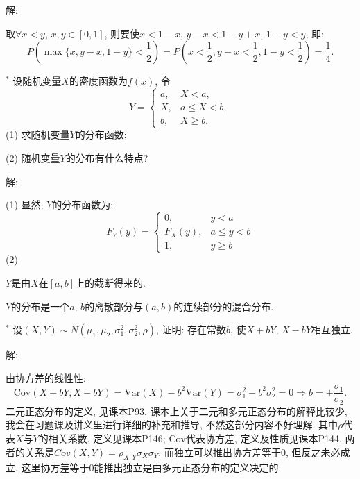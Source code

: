 \documentclass[standard]{ExBook}
\renewenvironment{shaded}{%
  \def\FrameCommand{\fboxsep=\FrameSep \colorbox{shadecolor}}%
  \MakeFramed{\advance\hsize-\width \FrameRestore}%
}{%
  \endMakeFramed
}
\begin{document}
\begin{qitems}
解: 

取$\forall x<y$, $x,y\in[0,1]$, 则要使$x<1-x$, $y-x<1-y+x$, $1-y<y$, 即:
$$P(\max\{x,y-x,1-y\}<\frac{1}{2})=P(x<\frac{1}{2},y-x<\frac{1}{2},1-y<\frac{1}{2})=\frac{1}{4}.$$

\vspace{2.5cm-5em}

    \begin{bbox}
    \begin{shaded}
        \qitem$^{*}$
设随机变量$X$的密度函数为$f(x)$, 令
$$
    Y=
    \left\{
    \begin{array}{ll}
        a, &X<a,\\
        X, &a\leq X<b,\\
        b, &X\geq b.
    \end{array}
    \right.
$$
(1) 求随机变量$Y$的分布函数;

(2) 随机变量$Y$的分布有什么特点?
    \end{shaded}
    \end{bbox}

\vspace{\dimexpr2.5cm-5em\relax}

解: 

(1) 显然, $Y$的分布函数为:
\[
F_Y(y) =
\begin{cases}
0, & y < a \\
F_X(y), & a \leq y < b \\
1, & y \geq b
\end{cases}
\]
(2) 

 $Y$是由$X$在$[a,b]$上的截断得来的.

 $Y$的分布是一个$a$, $b$的离散部分与$(a,b)$的连续部分的混合分布.

\vspace{2.5cm-5em}

    \begin{bbox}
    \begin{shaded}
        \qitem$^*$
设$(X,Y)\sim N(\mu_{1},\mu_{2},\sigma_{1}^{2},\sigma_{2}^{2},\rho)$, 证明: 存在常数$b$, 使$X+bY$, $X-bY$相互独立.
    \end{shaded}
    \end{bbox}

\vspace{\dimexpr2.5cm-5em\relax}

解: 

由协方差的线性性:
$$\mathrm{Cov}(X+bY,X-bY)=\mathrm{Var}(X)-b^2 \mathrm{Var}(Y)=\sigma_{1}^2-b^2 \sigma_{2}^2=0 \Longrightarrow b=\pm\frac{\sigma_1}{\sigma_2}.$$
\textcolor{themeColor}{\selectfont {} 二元正态分布的定义, 见课本P93. 课本上关于二元和多元正态分布的解释比较少, 我会在习题课及讲义里进行详细的补充和推导, 不然这部分内容不好理解. 其中$\rho$代表$X$与$Y$的相关系数, 定义见课本P146; $\mathrm{Cov}$代表协方差, 定义及性质见课本P144. 两者的关系是$Cov(X,Y)=\rho_{X,Y}\sigma_{X}\sigma_{Y}$. 而独立可以推出协方差等于0, 但反之未必成立. 这里协方差等于0能推出独立是由多元正态分布的定义决定的.}


\end{qitems}
\end{document}
